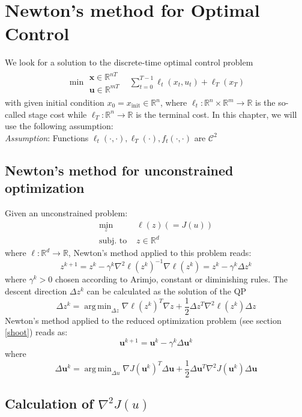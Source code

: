\documentclass[openany]{book}
\DeclareMathOperator*{\argmin}{arg\,min}  %
\newcommand{\R}{\mathbb{R}}               %
\theoremstyle{definition}
\theoremstyle{remark}
\begin{document}
\chapter{Newton's method for Optimal Control}
We look for a solution to the discrete-time optimal control problem 
\begin{align*}
    \min{\substack{\mathbf{x}\in\R^{nT}\\\mathbf{u}\in\R^{mT}}} & \displaystyle\sum_{t=0}^{T-1} \ell_t(x_t,u_t)+\ell_T(x_T)
\end{align*}
with given initial condition $x_0=x_{\text{init}}\in\R^n$, where $\ell_t:\R^n\times\R^m\to\R$ is the so-called stage cost while $\ell_T:\R^n\to\R$ is the terminal cost. In this chapter, we will use the following assumption:\\
\emph{Assumption}: Functions $\ell_t(\cdot,\cdot),\ell_T(\cdot),f_t(\cdot,\cdot)$ are $\mathcal{C}^2$

\section{Newton's method for unconstrained optimization}
Given an unconstrained problem: 
\begin{align*}
    \min_{z} & \ell(z) (=J(u))\\
    \text{subj. to } & z\in\R^d
\end{align*}
where $\ell:\R^d\to\R$, Newton's method applied to this problem reads:
\[
    z^{k+1} = z^k-\gamma^k\nabla^2\ell(z^k)^{-1}\nabla \ell(z^k) = z^k-\gamma^k\Delta z^k
\]
where $\gamma^k>0$ chosen according to Arimjo, constant or diminishing rules. The descent direction $\Delta z^k$ can be calculated as the solution of the QP 
\[
    \Delta z^k = \argmin_{\Delta z}\nabla\ell(z^k)^T\nabla z + \displaystyle\frac{1}{2} \Delta z^T\nabla^2\ell(z^k)\Delta z
\]
Newton's method applied to the reduced optimization problem (see section \ref{shoot}) reads as: 
\[
    \mathbf{u}^{k+1} = \mathbf{u}^k - \gamma^k \Delta\mathbf{u}^k
\]
where 
\[
    \Delta\mathbf{u}^k = \argmin_{\Delta u} \nabla J(\mathbf{u}^k)^T \Delta\mathbf{u} + \displaystyle\frac{1}{2}\Delta \mathbf{u}^T\nabla^2J(\mathbf{u}^k)\Delta\mathbf{u}
\]

\section{Calculation of \texorpdfstring{$\nabla^2J(u)$}{Calculation of the Hessian of J(u)}}
\end{document}
